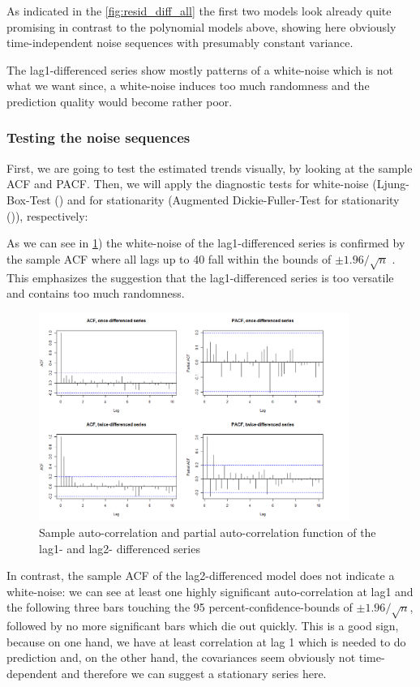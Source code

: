 \documentclass[11pt,a4paper]{article}
\begin{document}
As indicated in the \cref{fig:resid_diff_all} the first two models look already quite promising in contrast to the polynomial models above, showing here obviously time-independent noise sequences with presumably constant variance.

The lag1-differenced series show mostly patterns of a white-noise which is not what we want since, a white-noise induces too much randomness and the prediction quality would become rather poor.


\subsubsection{Testing the noise sequences}

First, we are going to test the estimated trends visually, by looking at the sample ACF and PACF.
Then, we will apply the diagnostic tests for white-noise (Ljung-Box-Test (\citep{LjungBox78}) and for stationarity (Augmented Dickie-Fuller-Test for stationarity (\citep{adf})), respectively:

As we can see in \cref{fig:diff12_acf_pacf}) the white-noise of the lag1-differenced series is confirmed by the sample ACF where all lags up to 40 fall within the bounds of $\pm 1.96/\sqrt{n}$ \cite[p.~39]{bd02}.
This emphasizes the suggestion that the lag1-differenced series is too versatile and contains too much randomness.

\begin{figure}
    \centering
    \includegraphics[width=0.9\textwidth]{diff12_acf_pacf}
    \caption{Sample auto-correlation and partial auto-correlation function of the lag1- and lag2- differenced series}
    \label{fig:diff12_acf_pacf}
\end{figure}

In contrast, the sample ACF of the lag2-differenced model does not indicate a white-noise: we can see at least one highly significant auto-correlation at lag1 and the following three bars touching the 95 percent-confidence-bounds of $\pm 1.96/\sqrt{n}$, followed by no more significant bars which die out quickly.
This is a good sign, because on one hand, we have at least correlation at lag 1 which is needed to do prediction and, on the other hand, the covariances seem obviously not time-dependent and therefore we can suggest a stationary series here.
\end{document}
